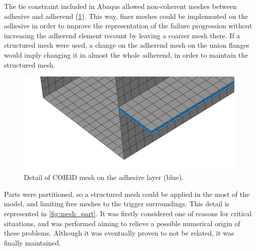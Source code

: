 \documentclass[cmfonts]{witpress}
\begin{document}
The tie constraint included in Abaqus allowed non-coherent meshes between adhesive and adherend (\cref{fig:mesh_detail_coh3d_comparison}). This way, finer meshes could be implemented on the adhesive in order to improve the representation of the failure progression without increasing the adherend element recount by leaving a coarser mesh there. If a structured mesh were used, a change on the adherend mesh on the union flanges would imply changing it in almost the whole adherend, in order to maintain the structured mesh.

\begin{figure}
	\centering
	\includegraphics[width=0.7\linewidth]{figures/IMG_CUTRES/mesh_detail_coh3d_comparison}
	\caption[Detail of COH3D mesh on the adhesive layer.]{Detail of COH3D mesh on the adhesive layer (blue).}
	\label{fig:mesh_detail_coh3d_comparison}
\end{figure}

Parts were partitioned, so a structured mesh could be applied in the most of the model, and limiting free meshes to the trigger surroundings. This detail is represented in \cref{fig:mesh_part}. It was firstly considered one of reasons for critical situations, and was performed aiming to relieve a possible numerical origin of these problems. Although it was eventually proven to not be related, it was finally maintained.
\end{document}
